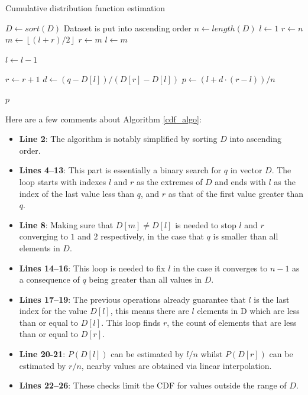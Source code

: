 \documentclass[10pt,final]{siamltex}
\begin{document}
\begin{algorithm}
  \caption{Cumulative distribution function estimation}
  \label{cdf_algo}
  \begin{algorithmic}[1]
    \State $D \gets sort(D)$
    \Comment Dataset is put into ascending order
    \State $n \gets length(D)$
    \State $l \gets 1$
    \State $r \gets n$
    \State $m \gets \left \lfloor{(l+r)/2}\right \rfloor$
    \State $r \gets m$
    \Else
    \State $l \gets m$
    \EndIf
    \EndWhile


    \State $l \gets l - 1$
    \EndWhile

    \State $r \gets r + 1$
    \EndWhile
    \State $d \gets (q-D[l])/(D[r]-D[l])$
    \State $p \gets (l + d \cdot (r - l))/n $

    \EndIf

    \State \Return $p$
    \EndFunction
  \end{algorithmic}
\end{algorithm}

Here are a few comments about Algorithm \ref{cdf_algo}:
\begin{itemize}
  \item \textbf{Line 2}: The algorithm is notably simplified by sorting $D$ into ascending order.
  \item \textbf{Lines 4--13}: This part is essentially a binary search for $q$ in vector $D$. The loop starts with indexes $l$ and $r$ as the extremes of $D$ and ends with $l$ as the index of the last value less than $q$, and $r$ as that of the first value greater than $q$.
  \item \textbf{Line 8}: Making sure that $D[m]\neq D[l]$ is needed to stop $l$ and $r$ converging to $1$ and $2$ respectively, in the case that $q$ is smaller than all elements in $D$.
  \item \textbf{Lines 14--16}: This loop is needed to fix $l$ in the case it converges to $n-1$ as a consequence of $q$ being greater than all values in $D$.
  \item \textbf{Lines 17--19}: The previous operations already guarantee that $l$ is the last index for the value $D[l]$, this means there are $l$ elements in D which are less than or equal to $D[l]$. This loop finds $r$, the count of elements that are less than or equal to $D[r]$.
  \item \textbf{Line 20-21}: $P(D[l])$ can be estimated by $l/n$ whilst $P(D[r])$ can be estimated by $r/n$, nearby values are obtained via linear interpolation.
  \item \textbf{Lines 22--26}: These checks limit the CDF for values outside the range of $D$.
\end{itemize}
%
\end{document}
